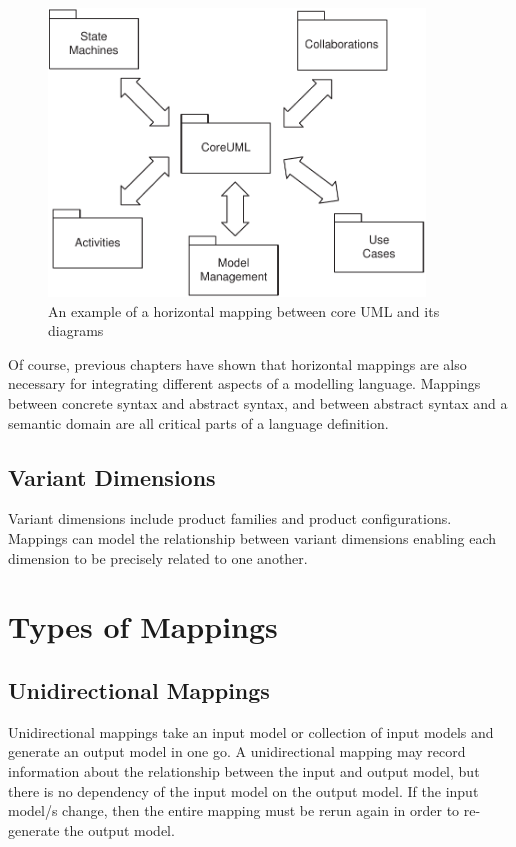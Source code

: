 \begin{figure}[htb]
\begin{center}
\includegraphics[width=10cm]{Mappings/figures/HorizontalMapExample}
\caption{An example of a horizontal mapping between core UML and
its diagrams} \label{horizontalmap}
\end{center}
\end{figure}

Of course, previous chapters have shown that horizontal mappings
are also necessary for integrating different aspects of a
modelling language. Mappings between concrete syntax and abstract
syntax, and between abstract syntax and a semantic domain are all
critical parts of a language definition.

\subsection{Variant Dimensions}

Variant dimensions include product families and product
configurations. Mappings can model the relationship between
variant dimensions enabling each dimension to be precisely related
to one another.

\section{Types of Mappings}

\subsection{Unidirectional Mappings}

Unidirectional mappings take an input model or collection of input
models and generate an output model in one go. A unidirectional
mapping may record information about the relationship between the
input and output model, but there is no dependency of the input
model on the output model. If the input model/s change, then the
entire mapping must be rerun again in order to re-generate the
output model.


